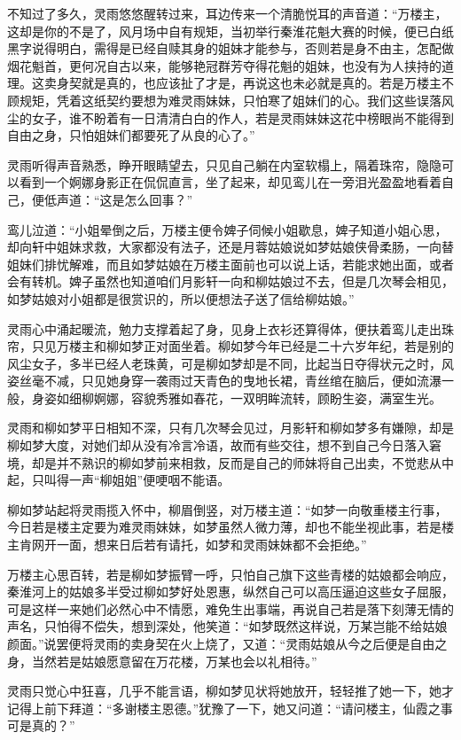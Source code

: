 不知过了多久，灵雨悠悠醒转过来，耳边传来一个清脆悦耳的声音道：“万楼主，这却是你的不是了，风月场中自有规矩，当初举行秦淮花魁大赛的时候，便已白纸黑字说得明白，需得是已经自赎其身的姐妹才能参与，否则若是身不由主，怎配做烟花魁首，更何况自古以来，能够艳冠群芳夺得花魁的姐妹，也没有为人挟持的道理。这卖身契就是真的，也应该扯了才是，再说这也未必就是真的。若是万楼主不顾规矩，凭着这纸契约要想为难灵雨妹妹，只怕寒了姐妹们的心。我们这些误落风尘的女子，谁不盼着有一日清清白白的作人，若是灵雨妹妹这花中榜眼尚不能得到自由之身，只怕姐妹们都要死了从良的心了。”

灵雨听得声音熟悉，睁开眼睛望去，只见自己躺在内室软榻上，隔着珠帘，隐隐可以看到一个婀娜身影正在侃侃直言，坐了起来，却见鸾儿在一旁泪光盈盈地看着自己，便低声道：“这是怎么回事？”

鸾儿泣道：“小姐晕倒之后，万楼主便令婢子伺候小姐歇息，婢子知道小姐心思，却向轩中姐妹求救，大家都没有法子，还是月蓉姑娘说如梦姑娘侠骨柔肠，一向替姐妹们排忧解难，而且如梦姑娘在万楼主面前也可以说上话，若能求她出面，或者会有转机。婢子虽然也知道咱们月影轩一向和柳姑娘过不去，但是几次琴会相见，如梦姑娘对小姐都是很赏识的，所以便想法子送了信给柳姑娘。”

灵雨心中涌起暖流，勉力支撑着起了身，见身上衣衫还算得体，便扶着鸾儿走出珠帘，只见万楼主和柳如梦正对面坐着。柳如梦今年已经是二十六岁年纪，若是别的风尘女子，多半已经人老珠黄，可是柳如梦却是不同，比起当日夺得状元之时，风姿丝毫不减，只见她身穿一袭雨过天青色的曳地长裙，青丝绾在脑后，便如流瀑一般，身姿如细柳婀娜，容貌秀雅如春花，一双明眸流转，顾盼生姿，满室生光。

灵雨和柳如梦平日相知不深，只有几次琴会见过，月影轩和柳如梦多有嫌隙，却是柳如梦大度，对她们却从没有冷言冷语，故而有些交往，想不到自己今日落入窘境，却是并不熟识的柳如梦前来相救，反而是自己的师妹将自己出卖，不觉悲从中起，只叫得一声“柳姐姐”便哽咽不能语。

柳如梦站起将灵雨揽入怀中，柳眉倒竖，对万楼主道：“如梦一向敬重楼主行事，今日若是楼主定要为难灵雨妹妹，如梦虽然人微力薄，却也不能坐视此事，若是楼主肯网开一面，想来日后若有请托，如梦和灵雨妹妹都不会拒绝。”

万楼主心思百转，若是柳如梦振臂一呼，只怕自己旗下这些青楼的姑娘都会响应，秦淮河上的姑娘多半受过柳如梦好处恩惠，纵然自己可以高压逼迫这些女子屈服，可是这样一来她们必然心中不情愿，难免生出事端，再说自己若是落下刻薄无情的声名，只怕得不偿失，想到深处，他笑道：“如梦既然这样说，万某岂能不给姑娘颜面。”说罢便将灵雨的卖身契在火上烧了，又道：“灵雨姑娘从今之后便是自由之身，当然若是姑娘愿意留在万花楼，万某也会以礼相待。”

灵雨只觉心中狂喜，几乎不能言语，柳如梦见状将她放开，轻轻推了她一下，她才记得上前下拜道：“多谢楼主恩德。”犹豫了一下，她又问道：“请问楼主，仙霞之事可是真的？”

